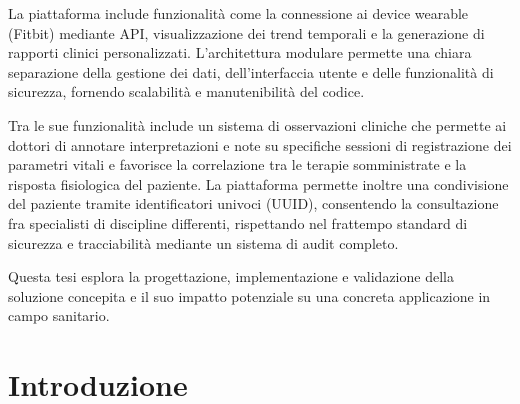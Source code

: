\documentclass[12pt,a4paper,oneside]{report}
\begin{document}
La piattaforma include funzionalità come la connessione ai device wearable (Fitbit) mediante API, visualizzazione dei trend temporali e la generazione di rapporti clinici personalizzati. L'architettura modulare permette una chiara separazione della gestione dei dati, dell'interfaccia utente e delle funzionalità di sicurezza, fornendo scalabilità e manutenibilità del codice.

Tra le sue funzionalità include un sistema di osservazioni cliniche che permette ai dottori di annotare interpretazioni e note su specifiche sessioni di registrazione dei parametri vitali e favorisce la correlazione tra le terapie somministrate e la risposta fisiologica del paziente. La piattaforma permette inoltre una condivisione del paziente tramite identificatori univoci (UUID), consentendo la consultazione fra specialisti di discipline differenti, rispettando nel frattempo standard di sicurezza e tracciabilità mediante un sistema di audit completo.

Questa tesi esplora la progettazione, implementazione e validazione della soluzione concepita e il suo impatto potenziale su una concreta applicazione in campo sanitario.

\newpage

\tableofcontents
\newpage


\pagestyle{fancy}  %


\chapter{Introduzione}
\end{document}
